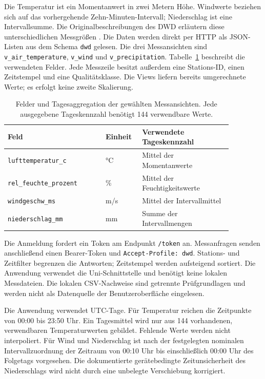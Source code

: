 \documentclass[usegeometry=true]{scrartcl}
\begin{document}
Die Temperatur ist ein Momentanwert in zwei Metern Höhe. Windwerte beziehen
sich auf das vorhergehende Zehn-Minuten-Intervall; Niederschlag ist eine
Intervallsumme. Die Originalbeschreibungen des DWD erläutern diese
unterschiedlichen Messgrößen \autocite{dwd2024temperature,dwd2024wind,dwd2024precipitation}.
Die Daten werden direkt per HTTP als JSON-Listen aus dem Schema
\texttt{dwd} gelesen. Die drei Messansichten sind
\texttt{v\_air\_temperature}, \texttt{v\_wind} und
\texttt{v\_precipitation}. Tabelle~\ref{tab:fields} beschreibt die
verwendeten Felder. Jede Messzeile besitzt außerdem eine Stations-ID,
einen Zeitstempel und eine Qualitätsklasse. Die Views liefern bereits
umgerechnete Werte; es erfolgt keine zweite Skalierung.
\begin{table}[htbp]
  \centering
  \small
  \begin{tabular}{p{0.39\linewidth}p{0.12\linewidth}p{0.36\linewidth}}
    Feld & Einheit & Verwendete Tageskennzahl \\
    \hline
    \texttt{lufttemperatur\_c} & °C & Mittel der Momentanwerte \\
    \texttt{rel\_feuchte\_prozent} & \% & Mittel der Feuchtigkeitswerte \\
    \texttt{windgeschw\_ms} & m/s & Mittel der Intervallmittel \\
    \texttt{niederschlag\_mm} & mm & Summe der Intervallmengen \\
  \end{tabular}
  \caption{Felder und Tagesaggregation der gewählten Messansichten.
  Jede ausgegebene Tageskennzahl benötigt 144 verwendbare Werte.}
  \label{tab:fields}
\end{table}

Die Anmeldung fordert ein Token am Endpunkt \texttt{/token} an.
Messanfragen senden anschließend einen Bearer-Token und
\texttt{Accept-Profile: dwd}. Stations- und Zeitfilter begrenzen die
Antworten; Zeitstempel werden aufsteigend sortiert. Die Anwendung
verwendet die Uni-Schnittstelle und benötigt keine lokalen Messdateien.
Die lokalen CSV-Nachweise sind getrennte Prüfgrundlagen und werden nicht
als Datenquelle der Benutzeroberfläche eingelesen.

Die Anwendung verwendet UTC-Tage. Für Temperatur reichen die Zeitpunkte von
00:00 bis 23:50 Uhr. Ein Tagesmittel wird nur aus 144 vorhandenen,
verwendbaren Temperaturwerten gebildet. Fehlende Werte werden nicht
interpoliert. Für Wind und Niederschlag ist nach der festgelegten nominalen
Intervallzuordnung der Zeitraum von 00:10 Uhr bis einschließlich 00:00 Uhr
des Folgetags vorgesehen. Die dokumentierte gerätebedingte Zeitunsicherheit
des Niederschlags wird nicht durch eine unbelegte Verschiebung korrigiert.
\end{document}
